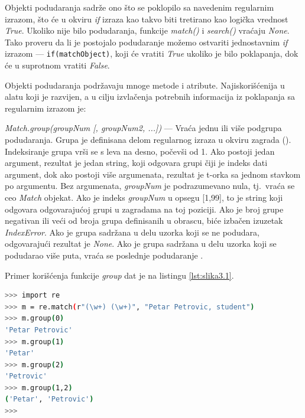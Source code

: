 \documentclass[12pt,oneside]{memoir}
\theoremstyle{plain}
\theoremstyle{definition}
\begin{document}
Objekti podudaranja sadrže ono što se poklopilo sa navedenim regularnim izrazom, što će u okviru \textit{if} izraza kao takvo biti tretirano kao logička vrednost \textit{True}. Ukoliko nije bilo podudaranja, funkcije \textit{match()} i \textit{search()} vraćaju \textit{None}. 
Tako proveru da li je postojalo podudaranje možemo ostvariti jednostavnim \textit{if} izrazom --- \texttt{if(matchObject)}, koji će vratiti \textit{True} ukoliko je bilo poklapanja, dok će u suprotnom vratiti \textit{False}.

Objekti podudaranja podržavaju mnoge metode i atribute. Najiskorišćenija u alatu koji je razvijen, a u cilju izvlačenja potrebnih informacija iz poklapanja sa regularnim izrazom je:
\begin{description}
\item \textit{Match.group(groupNum [, groupNum2, ...])} --- Vraća jednu ili više podgrupa podudaranja. Grupa je definisana delom regularnog izraza u okviru zagrada (). Indeksiranje grupa vrši se s leva na desno, počevši od 1. Ako postoji jedan argument, rezultat je jedan string, koji odgovara grupi čiji je indeks dati argument, dok ako postoji više argumenata, rezultat je t-orka sa jednom stavkom po argumentu. Bez argumenata, \textit{groupNum} je  podrazumevano nula, tj.~vraća se ceo \textit{Match} objekat. Ako je indeks \textit{groupNum} u opsegu [1,99], to je string koji odgovara odgovarajućoj grupi u zagradama na toj poziciji. Ako je broj grupe negativan ili veći od broja grupa definisanih u obrascu, biće izbačen izuzetak \textit{IndexError}. Ako je grupa sadržana u delu uzorka koji se ne podudara, odgovarajući rezultat je \textit{None}. Ako je grupa sadržana u delu uzorka koji se podudarao više puta, vraća se poslednje podudaranje \cite{reModule}.
\end{description}

Primer korišćenja funkcije \textit{group} dat je na listingu \ref{lst:slika3.1}.

\begin{lstlisting}[style=terminal,caption={Primer korišćenja funkcije \textit{group} modula \textit{re}}, label={lst:slika3.1},language={bash}] 
>>> import re
>>> m = re.match(r"(\w+) (\w+)", "Petar Petrovic, student")
>>> m.group(0)
'Petar Petrovic'
>>> m.group(1)
'Petar'
>>> m.group(2)
'Petrovic'
>>> m.group(1,2)
('Petar', 'Petrovic')
>>>
\end{lstlisting}
\end{document}
